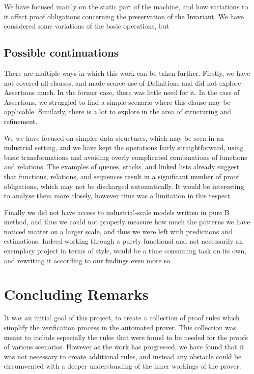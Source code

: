 \documentclass[11pt,journal]{IEEEtran}
\begin{document}
	We have focused mainly on the static part of the machine, and how variations to it affect proof obligations concerning the preservation of the Invariant. We have considered some variations of the basic operations, but 
	
	\subsection{Possible continuations}
	There are multiple ways in which this work can be taken further. Firstly, we have not covered all clauses, and made scarce use of Definitions and did not explore Assertions much. In the former case, there was little need for it. In the case of Assertions, we struggled to find a simple scenario where this clause may be applicable. Similarly, there is a lot to explore in the area of structuring and refinement.
	
	We we have focused on simpler data structures, which may be seen in an industrial setting, and we have kept the operations fairly straightforward, using basic transformations and avoiding overly complicated combinations of functions and relations. The examples of queues, stacks, and linked lists already suggest that functions, relations, and sequences result in a significant number of proof obligations, which may not be discharged automatically. It would be interesting to analyse them more closely, however time was a limitation in this respect.
	
	Finally we did not have access to industrial-scale models written in pure B method, and thus we could not properly measure how much the patterns we have noticed matter on a larger scale, and thus we were left with predictions and estimations. Indeed working through a purely functional and not necessarily an exemplary project in terms of style, would be a time consuming task on its own, and rewriting it according to our findings even more so. 
	
	\section{Concluding Remarks}

	It was an initial goal of this project, to create a collection of proof rules which simplify the verification process in the automated prover. This collection was meant to include especially the rules that were found to be needed for the proofs of various scenarios. However as the work has progressed, we have found that it was not necessary to create additional rules, and instead any obstacle could be circumvented with a deeper understanding of the inner workings of the prover.
	
\end{document}

